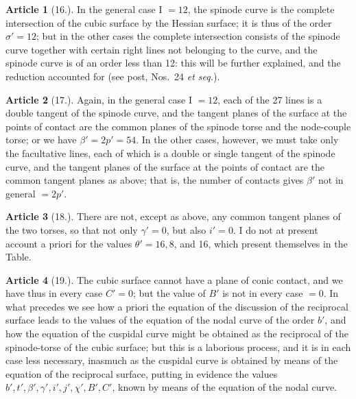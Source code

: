 \documentclass[11pt,a4paper]{article}
\theoremstyle{definition}
\newtheorem{art}{Article}
\begin{document}
\begin{art}[16.]
In the general case I $= 12$, the spinode curve is the complete intersection of the cubic surface by the Hessian surface; it is thus of the order $\sigma' = 12$; but in the other cases the complete intersection consists of the spinode curve together with certain right lines not belonging to the curve, and the spinode curve is of an order less than 12: this will be further explained, and the reduction accounted for (see post, Nos.~24 \textit{et seq.}).
\end{art}

\begin{art}[17.]
Again, in the general case I $= 12$, each of the 27 lines is a double tangent of the spinode curve, and the tangent planes of the surface at the points of contact are the common planes of the spinode torse and the node-couple torse; or we have $\beta' = 2p' = 54$. In the other cases, however, we must take only the facultative lines, each of which is a double or single tangent of the spinode curve, and the tangent planes of the surface at the points of contact are the common tangent planes as above; that is, the number of contacts gives $\beta'$ not in general $= 2p'$.
\end{art}

\begin{art}[18.]
There are not, except as above, any common tangent planes of the two torses, so that not only $\gamma' = 0$, but also $i' = 0$. I do not at present account a priori for the values $\theta' = 16, 8$, and 16, which present themselves in the Table.
\end{art}

\begin{art}[19.]
The cubic surface cannot have a plane of conic contact, and we have thus in every case $C' = 0$; but the value of $B'$ is not in every case $= 0$. In what precedes we see how a priori the equation of the discussion of the reciprocal surface leads to the values of the equation of the nodal curve of the order $b'$, and how the equation of the cuspidal curve might be obtained as the reciprocal of the spinode-torse of the cubic surface; but this is a laborious process, and it is in each case less necessary, inasmuch as the cuspidal curve is obtained by means of the equation of the reciprocal surface, putting in evidence the values $b', t', \beta', \gamma', i', j', \chi', B', C'$, known by means of the equation of the nodal curve.
\end{art}
\end{document}
